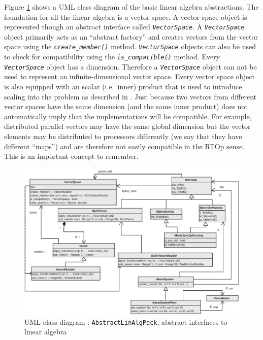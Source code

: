 \documentclass[pdf,ps2pdf,11pt]{SANDreport}
\begin{document}
Figure {}\ref{moocho:fig:AbstractLinAlgPack} shows a UML class diagram of the
basic linear algebra abstractions.  The foundation for all the linear algebra
is a vector space.  A vector space object is represented though an abstract
interface called {}\texttt{\textit{VectorSpace}}.  A
{}\texttt{\textit{VectorSpace}} object primarily acts as an ``abstract
factory'' {}\cite{ref:gama_et_al_1995} and creates vectors from the vector
space using the {}\texttt{\textit{create\_member()}} method.
{}\texttt{\textit{Vector\-Space}} objects can also be used to check for
compatibility using the {}\texttt{\textit{is\_compatible()}} method.  Every
{}\texttt{\textit{Vector\-Space}} object has a dimension.  Therefore a
{}\texttt{\textit{Vector\-Space}} object can not be used to represent an
infinite-dimensional vector space.  Every vector space object is also equipped
with an scalar (i.e.\ inner) product that is used to introduce scaling into
the problem as described in {}\cite{ref:opt_ctrl_itfc}.  Just because two
vectors from different vector spaces have the same dimension (and the same
inner product) does not automatically imply that the implementations will be
compatible.  For example, distributed parallel vectors may have the same
global dimension but the vector elements may be distributed to processors
differently (we say that they have different ``maps'') and are therefore not
easily compatible in the RTOp sense.  This is an important concept to
remember.

{\bsinglespace
\begin{figure}[t]
\begin{center}
\includegraphics*[bb= 0.0in 0.0in 7.9in 5.6in,scale=0.70
]{AbstractLinAlgPack}
\end{center}
\caption{\label{moocho:fig:AbstractLinAlgPack}
UML class diagram : {}\texttt{AbstractLinAlgPack}, abstract interfaces to linear algebra
}
\end{figure}
\esinglespace}
\end{document}
